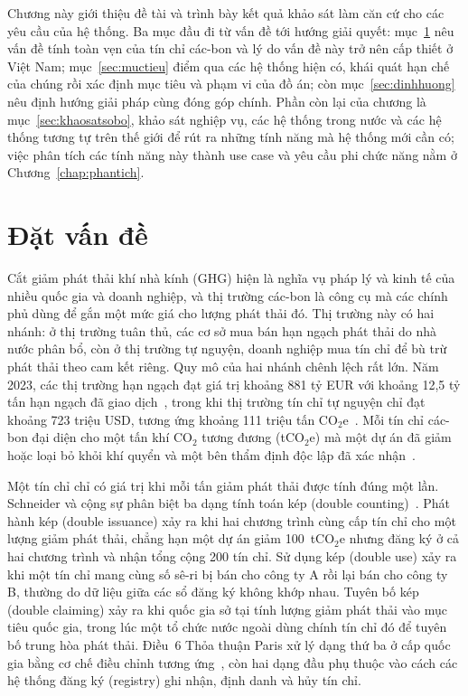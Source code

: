 Chương này giới thiệu đề tài và trình bày kết quả khảo sát làm căn cứ cho các yêu cầu của hệ thống. Ba mục đầu đi từ vấn đề tới hướng giải quyết: mục~\ref{sec:datvande} nêu vấn đề tính toàn vẹn của tín chỉ các-bon và lý do vấn đề này trở nên cấp thiết ở Việt Nam; mục~\ref{sec:muctieu} điểm qua các hệ thống hiện có, khái quát hạn chế của chúng rồi xác định mục tiêu và phạm vi của đồ án; còn mục~\ref{sec:dinhhuong} nêu định hướng giải pháp cùng đóng góp chính. Phần còn lại của chương là mục~\ref{sec:khaosatsobo}, khảo sát nghiệp vụ, các hệ thống trong nước và các hệ thống tương tự trên thế giới để rút ra những tính năng mà hệ thống mới cần có; việc phân tích các tính năng này thành use case và yêu cầu phi chức năng nằm ở Chương~\ref{chap:phantich}.

\section{Đặt vấn đề}
\label{sec:datvande}
\label{sec:dongluc}

Cắt giảm phát thải khí nhà kính (GHG) hiện là nghĩa vụ pháp lý và kinh tế của nhiều quốc gia và doanh nghiệp, và thị trường các-bon là công cụ mà các chính phủ dùng để gắn một mức giá cho lượng phát thải đó. Thị trường này có hai nhánh: ở thị trường tuân thủ, các cơ sở mua bán hạn ngạch phát thải do nhà nước phân bổ, còn ở thị trường tự nguyện, doanh nghiệp mua tín chỉ để bù trừ phát thải theo cam kết riêng. Quy mô của hai nhánh chênh lệch rất lớn. Năm 2023, các thị trường hạn ngạch đạt giá trị khoảng 881 tỷ EUR với khoảng 12,5 tỷ tấn hạn ngạch đã giao dịch~\cite{lseg2024yir}, trong khi thị trường tín chỉ tự nguyện chỉ đạt khoảng 723 triệu USD, tương ứng khoảng 111 triệu tấn CO$_2$e~\cite{foresttrends2024sovcm}. Mỗi tín chỉ các-bon đại diện cho một tấn khí CO$_2$ tương đương (tCO$_2$e) mà một dự án đã giảm hoặc loại bỏ khỏi khí quyển và một bên thẩm định độc lập đã xác nhận~\cite{verra2024vcs}.

Một tín chỉ chỉ có giá trị khi mỗi tấn giảm phát thải được tính đúng một lần. Schneider và cộng sự phân biệt ba dạng tính toán kép (double counting)~\cite{schneider2019double}. Phát hành kép (double issuance) xảy ra khi hai chương trình cùng cấp tín chỉ cho một lượng giảm phát thải, chẳng hạn một dự án giảm 100~tCO$_2$e nhưng đăng ký ở cả hai chương trình và nhận tổng cộng 200 tín chỉ. Sử dụng kép (double use) xảy ra khi một tín chỉ mang cùng số sê-ri bị bán cho công ty A rồi lại bán cho công ty B, thường do dữ liệu giữa các sổ đăng ký không khớp nhau. Tuyên bố kép (double claiming) xảy ra khi quốc gia sở tại tính lượng giảm phát thải vào mục tiêu quốc gia, trong lúc một tổ chức nước ngoài dùng chính tín chỉ đó để tuyên bố trung hòa phát thải. Điều~6 Thỏa thuận Paris xử lý dạng thứ ba ở cấp quốc gia bằng cơ chế điều chỉnh tương ứng~\cite{unfccc2022cma3}, còn hai dạng đầu phụ thuộc vào cách các hệ thống đăng ký (registry) ghi nhận, định danh và hủy tín chỉ.


